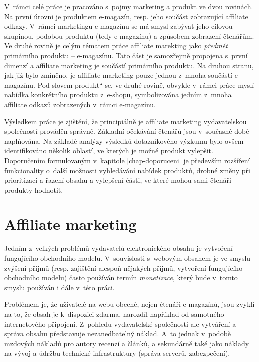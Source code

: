 \documentclass[12pt,twoside,openany]{fithesis}
\makeatletter
\def\cleardoublepage{\clearpage\if@twoside \ifodd\c@page\else
        \thispagestyle{empty}
        \hbox{}\newpage\if@twocolumn\hbox{}\newpage\fi\fi\fi}
\makeatother
\begin{document}
V~rámci celé práce je pracováno s~pojmy marketing a produkt ve dvou 
rovinách. Na první úrovni je produktem e-magazín, resp. jeho součást 
zobrazující affiliate odkazy. V~rámci marketingu e-magazínu se má smysl 
zabývat jeho cílovou skupinou, podobou produktu (tedy e-magazínu) a 
způsobem zobrazení čtenářům. Ve druhé rovině je celým tématem práce 
affiliate marekting jako {\em{předmět}} primárního produktu -- e-magazínu. 
Tato část je samozřejmě propojena s~první dimenzí a affiliate marketing 
je součástí primárního produktu. Na druhou stranu, jak již bylo 
zmíněno, je affiliate marketing pouze jednou z~mnoha součástí e-magazínu. 
Pod slovem \glqq produkt\textquotedblleft{} se, ve druhé rovině, obvykle 
v~rámci práce myslí nabídka konkrétního produktu z~e-shopu, 
symbolizována jedním z~mnoha affiliate odkazů zobrazených v~rámci 
e-magazínu.

Výsledkem práce je zjištění, že principiálně je affiliate marketing 
vydavatelskou společností prováděn správně. Základní očekávání 
čtenářů jsou v~současné době naplňována. Na základě analýzy 
výsledků dotazníkového výzkumu bylo ovšem identifikováno několik 
oblastí, ve kterých je možné produkt vylepšit. Doporučením formulovaným 
v~kapitole \hyperlink{chap-doporuceni}{{\ref{chap-doporuceni}}} je především 
rozšíření funkcionality o~další možnosti vyhledávání nabídek 
produktů, drobné změny při prioritizaci a řazení obsahu a vylepšení 
části, ve které mohou sami čtenáři produkty hodnotit.

\cleardoublepage\chapter{Affiliate marketing}
\label{chap-am}\hypertarget{chap-am}{}%

Jedním z~velkých problémů vydavatelů elektronického obsahu je vytvoření 
fungujícího obchodního modelu. V~souvislosti s~webovým obsahem je ve smyslu 
zvýšení příjmů (resp. zajištění alespoň nějakých příjmů, 
vytvoření fungujícího obchodního modelu) často používán termín 
{\em{monetizace}}, který bude v~tomto smyslu používán i 
dále v~této práci.

Problémem je, že uživatelé na webu obecně, nejen čtenáři e-magazínů, 
jsou zvyklí na to, že obsah je k~dispozici zdarma, narozdíl například od 
samotného internetového připojení. \cite{lupa-datator}{} Z~pohledu 
vydavatelské společnosti ale vytváření a správa obsahu představuje 
nezanedbatelný náklad. A~to jednak v~podobě mzdových nákladů pro autory 
recenzí a článků, a sekundárně také jako náklady na vývoj a údržbu 
technické infrastruktury (správa serverů, zabezpečení).
\end{document}
